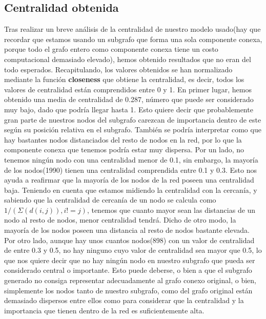 \subsection{Centralidad obtenida}
Tras realizar un breve an\'alisis de la centralidad de nuestro modelo usado(hay que recordar que estamos usando un subgrafo que forma una sola componente conexa, porque todo el grafo entero como componente conexa tiene un costo computacional demasiado elevado), hemos obtenido resultados que no eran del todo esperados.\newline
Recapitulando, los valores obtenidos se han normalizado mediante la funci\'on \textbf{closeness} que obtiene la centralidad, es decir, todos los valores de centralidad est\'an comprendidos entre 0 y 1. En primer lugar, hemos obtenido una media de centralidad de 0.287, n\'umero que puede ser considerado muy bajo, dado que podr\'ia llegar hasta 1. Esto quiere decir que probablemente gran parte de nuestros nodos del subgrafo carezcan de importancia dentro de este seg\'un su posici\'on relativa en el subgrafo. Tambi\'en se podr\'ia interpretar como que hay bastantes nodos distanciados del resto de nodos en la red, por lo que la componente conexa que tenemos podr\'ia estar muy dispersa.\newline
Por un lado, no tenemos ning\'un nodo con una centralidad menor de 0.1, sin embargo, la mayor\'ia de los nodos(1990) tienen una centralidad comprendida entre 0.1 y 0.3. Esto nos ayuda a reafirmar que la mayor\'ia de los nodos de la red poseen una centralidad baja. Teniendo en cuenta que estamos midiendo la centralidad con la cercan\'ia, y sabiendo que la centralidad de cercan\'ia de un nodo se calcula como $1/(\Sigma(d(i,j)), i != j)$, tenemos que cuanto mayor sean las distancias de un nodo al resto de nodos, menor centralidad tendr\'a. Dicho de otro modo, la mayor\'ia de los nodos poseen una distancia al resto de nodos bastante elevada.\newline
Por otro lado, aunque hay unos cuantos nodos(898) con un valor de centralidad de entre 0.3 y 0.5, no hay ninguno cuyo valor de centralidad sea mayor que 0.5, lo que nos quiere decir que no hay ning\'un nodo en nuestro subgrafo que pueda ser considerado central o importante. Esto puede deberse, o bien a que el subgrafo generado no consiga representar adecuadamente al grafo conexo original, o bien, simplemente los nodos tanto de nuestro subgrafo, como del grafo original est\'an demasiado dispersos entre ellos como para considerar que la centralidad y la importancia que tienen dentro de la red es suficientemente alta.

